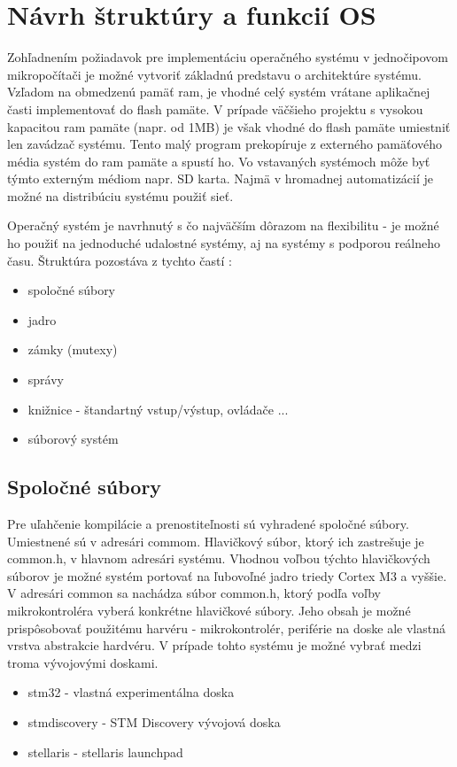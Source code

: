 \chapter{Návrh štruktúry a funkcií OS}
 
Zohľadnením požiadavok pre implementáciu operačného systému v jednočipovom mikropočítači je možné vytvoriť základnú predstavu o architektúre systému. Vzľadom na obmedzenú pamäť ram, je vhodné celý systém vrátane aplikačnej časti implementovať do flash pamäte. V prípade väčšieho projektu s vysokou kapacitou ram pamäte (napr. od 1MB) je však vhodné do flash pamäte umiestniť len zavádzač systému. Tento malý program prekopíruje z externého pamäťového média systém do ram pamäte a spustí ho. Vo vstavaných systémoch môže byť týmto externým médiom napr. SD karta. Najmä v hromadnej automatizácií je možné na distribúciu systému použiť sieť.

Operačný systém je navrhnutý s čo najväčším dôrazom na flexibilitu - je možné ho použiť na jednoduché udalostné systémy, aj na systémy s podporou reálneho času. Štruktúra pozostáva z tychto častí :

\begin{itemize}      
 \item spoločné súbory
 \item jadro
 \item zámky (mutexy)
 \item správy
 \item knižnice - štandartný vstup/výstup, ovládače ...
 \item súborový systém
\end{itemize}

\section{Spoločné súbory}

Pre uľahčenie kompilácie a prenostiteľnosti sú vyhradené spoločné súbory. Umiestnené sú v adresári commom. Hlavičkový súbor, ktorý ich zastrešuje je common.h, v hlavnom adresári systému. Vhodnou voľbou týchto hlavičkových súborov je možné systém portovať na ľubovoľné jadro triedy Cortex M3 a vyššie. V adresári common sa nachádza súbor common.h, ktorý podľa voľby mikrokontroléra vyberá konkrétne hlavičkové súbory. Jeho obsah je možné prispôsobovať použitému harvéru - mikrokontrolér, periférie na doske ale vlastná vrstva abstrakcie hardvéru.
V prípade tohto systému je možné vybrať medzi troma vývojovými doskami.
\begin{itemize}  
 \item stm32 - vlastná experimentálna doska
 \item stmdiscovery - STM Discovery vývojová doska
 \item stellaris - stellaris launchpad
\end{itemize}

